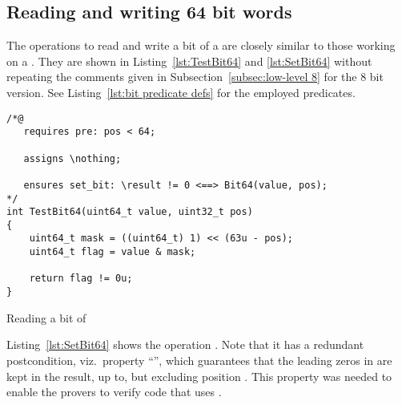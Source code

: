 \FloatBarrier

\subsection{Reading and writing 64 bit words}
\label{subsec:low-level 64}



The operations to read and write a bit of a 
are closely similar to
those working on a .
%
They are shown in Listing~\ref{lst:TestBit64}
and \ref{lst:SetBit64} without repeating the comments given
in Subsection~\ref{subsec:low-level 8} for the 8 bit version.
%
See Listing~\ref{lst:bit predicate defs} for the employed \acsl predicates.





\begin{listing}[hbt]
\begin{minipage}{0.99\textwidth}
\begin{lstlisting}[style=acsl-block]
/*@
   requires pre: pos < 64;

   assigns \nothing;

   ensures set_bit: \result != 0 <==> Bit64(value, pos);
*/
int TestBit64(uint64_t value, uint32_t pos)
{
    uint64_t mask = ((uint64_t) 1) << (63u - pos);
    uint64_t flag = value & mask;

    return flag != 0u;
}
\end{lstlisting}
\end{minipage}
\caption{\label{lst:TestBit64}Reading a bit of }
\end{listing}

\FloatBarrier








Listing~\ref{lst:SetBit64} shows the operation .
%
Note that it has a redundant postcondition, viz.\ property
``'', which guarantees that the leading zeros in
 are kept in the result, up to, but excluding
position .
%
This property was needed to enable the provers to verify code that uses
.




